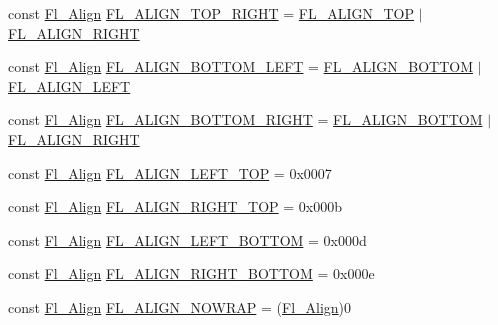 \begin{DoxyCompactItemize}
const \hyperlink{_enumerations_8_h_a44e8bcd1e030e65e4f88cbae64a7c3e3}{Fl\+\_\+\+Align} \hyperlink{_enumerations_8_h_a2994f88481b359b5bbcce9de598150fd}{F\+L\+\_\+\+A\+L\+I\+G\+N\+\_\+\+T\+O\+P\+\_\+\+R\+I\+G\+HT} = \hyperlink{_enumerations_8_h_a62b22e4022b39d90a2d3962ae144f2e8}{F\+L\+\_\+\+A\+L\+I\+G\+N\+\_\+\+T\+OP} $\vert$ \hyperlink{_enumerations_8_h_a16646615fa4863fae6f7975b36c3987e}{F\+L\+\_\+\+A\+L\+I\+G\+N\+\_\+\+R\+I\+G\+HT}
\item 
const \hyperlink{_enumerations_8_h_a44e8bcd1e030e65e4f88cbae64a7c3e3}{Fl\+\_\+\+Align} \hyperlink{_enumerations_8_h_ac99f378b578558c16fa41c7023b53d55}{F\+L\+\_\+\+A\+L\+I\+G\+N\+\_\+\+B\+O\+T\+T\+O\+M\+\_\+\+L\+E\+FT} = \hyperlink{_enumerations_8_h_a1ea3fa817f07b80dced581f58de842ae}{F\+L\+\_\+\+A\+L\+I\+G\+N\+\_\+\+B\+O\+T\+T\+OM} $\vert$ \hyperlink{_enumerations_8_h_aee67f09771b16bc5da1f1ee860681be5}{F\+L\+\_\+\+A\+L\+I\+G\+N\+\_\+\+L\+E\+FT}
\item 
const \hyperlink{_enumerations_8_h_a44e8bcd1e030e65e4f88cbae64a7c3e3}{Fl\+\_\+\+Align} \hyperlink{_enumerations_8_h_ad5c91c4f8b87d48ba1a1120d726bca87}{F\+L\+\_\+\+A\+L\+I\+G\+N\+\_\+\+B\+O\+T\+T\+O\+M\+\_\+\+R\+I\+G\+HT} = \hyperlink{_enumerations_8_h_a1ea3fa817f07b80dced581f58de842ae}{F\+L\+\_\+\+A\+L\+I\+G\+N\+\_\+\+B\+O\+T\+T\+OM} $\vert$ \hyperlink{_enumerations_8_h_a16646615fa4863fae6f7975b36c3987e}{F\+L\+\_\+\+A\+L\+I\+G\+N\+\_\+\+R\+I\+G\+HT}
\item 
const \hyperlink{_enumerations_8_h_a44e8bcd1e030e65e4f88cbae64a7c3e3}{Fl\+\_\+\+Align} \hyperlink{_enumerations_8_h_ad4b4d82940cf211c16057ab7424a1f15}{F\+L\+\_\+\+A\+L\+I\+G\+N\+\_\+\+L\+E\+F\+T\+\_\+\+T\+OP} = 0x0007
\item 
const \hyperlink{_enumerations_8_h_a44e8bcd1e030e65e4f88cbae64a7c3e3}{Fl\+\_\+\+Align} \hyperlink{_enumerations_8_h_aab3b54d51a61ad3964e483c838bb78fc}{F\+L\+\_\+\+A\+L\+I\+G\+N\+\_\+\+R\+I\+G\+H\+T\+\_\+\+T\+OP} = 0x000b
\item 
const \hyperlink{_enumerations_8_h_a44e8bcd1e030e65e4f88cbae64a7c3e3}{Fl\+\_\+\+Align} \hyperlink{_enumerations_8_h_a1ec807dbbb67f9967f6c28170e1d76d8}{F\+L\+\_\+\+A\+L\+I\+G\+N\+\_\+\+L\+E\+F\+T\+\_\+\+B\+O\+T\+T\+OM} = 0x000d
\item 
const \hyperlink{_enumerations_8_h_a44e8bcd1e030e65e4f88cbae64a7c3e3}{Fl\+\_\+\+Align} \hyperlink{_enumerations_8_h_a2da73b94e785bf9b0306ea5156f8fd04}{F\+L\+\_\+\+A\+L\+I\+G\+N\+\_\+\+R\+I\+G\+H\+T\+\_\+\+B\+O\+T\+T\+OM} = 0x000e
\item 
const \hyperlink{_enumerations_8_h_a44e8bcd1e030e65e4f88cbae64a7c3e3}{Fl\+\_\+\+Align} \hyperlink{_enumerations_8_h_a701d6772556fa35f072a6d661655c27c}{F\+L\+\_\+\+A\+L\+I\+G\+N\+\_\+\+N\+O\+W\+R\+AP} = (\hyperlink{_enumerations_8_h_a44e8bcd1e030e65e4f88cbae64a7c3e3}{Fl\+\_\+\+Align})0

\end{DoxyCompactItemize}
